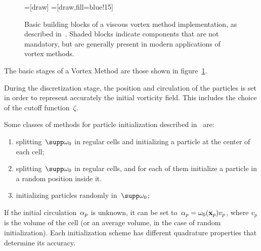 \begin{figure}
  \centering
  =[draw]
  =[draw,fill=blue!15]
  \label{fig:vm-blocks}
  \caption{Basic building blocks of a viscous vortex method implementation,
    as described in~\cite[\S1.2]{barba04}. Shaded blocks indicate components
    that are not mandatory, but are generally present in modern applications
    of vortex methods.}
\end{figure}

The basic stages of a Vortex Method are those shown in figure~\ref{fig:vm-blocks}.


During the discretization stage,
the position and circulation of the particles is set
in order to represent accurately the initial vorticity field.
This includes the choice of the cutoff function~\(\zeta\).

Some classes of methods for particle initialization
described in~\cite[\S2.4]{cottet00} are:
\begin{enumerate}
  \item splitting~\(\supp\vort_0\) in regular cells
    and initializing a particle at the center of each cell;
  \item splitting~\(\supp\vort_0\) in regular cells,
    and for each of them initialize a particle in a random position inside it.
  \item initializing particles randomly in~\(\supp\vort_0\);
\end{enumerate}
If the initial circulation~\(\alpha_p\) is unknown,
it can be set to~\(\alpha_p = \omega_0(\mathbf x_p) v_p\),
where \(v_p\) is the volume of the cell
(or an average volume, in the case of random initialization).
Each initialization scheme has different quadrature properties
that determine its accuracy.

